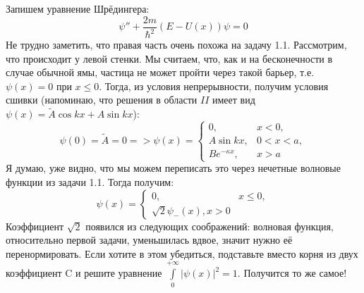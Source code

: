 Запишем уравнение Шрёдингера:
\[
\psi'' + \frac{2m}{\hbar^2}(E-U(x))\psi = 0 
\]
Не трудно заметить, что правая часть очень похожа на задачу 1.1. Рассмотрим, что происходит у левой стенки. Мы считаем, что, как и на бесконечности в случае обычной ямы, частица не может пройти через такой барьер, т.е. $\psi(x) = 0$ при $x\leq 0$. Тогда, из условия непрерывности, получим условия сшивки (напоминаю, что решения в области $II$ имеет вид $\psi(x) = \widetilde{A}\cos kx + A\sin kx$):
\[
\psi(0) = \widetilde{A} = 0 => \psi(x) =
\begin{cases}
    0,& x < 0,\\
    A\sin kx,& 0<x<a,\\
    Be^{-\kappa x},& x>a
\end{cases}
\]
Я думаю, уже видно, что мы можем переписать это через нечетные волновые функции из задачи 1.1. Тогда получим:
\[
\psi(x) =
\begin{cases}
    0,& x\leq 0,\\
    \sqrt{2}\psi_-(x), x>0
\end{cases}
\]
Коэффициент $\sqrt{2}$ появился из следующих соображений: волновая функция, относительно первой задачи, уменьшилась вдвое, значит нужно её перенормировать. Если хотите в этом убедиться, подставьте вместо корня из двух коэффициент C и решите уравнение $\int\limits_0^{+\infty}|\psi(x)|^2 = 1$. Получится то же самое!


